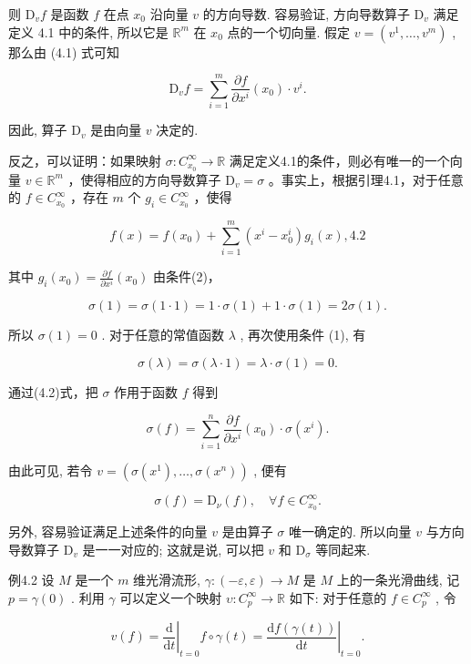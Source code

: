 则  $\mathrm{D}_v f$  是函数  $f$  在点  $x_0$  沿向量  $v$  的方向导数. 容易验证, 方向导数算子  $\mathrm{D}_v$  满足定义 4.1 中的条件, 所以它是  $\mathbb{R}^m$  在  $x_0$  点的一个切向量. 假定  $v = (v^1, \dots, v^m)$ , 那么由 (4.1) 式可知

$$
\mathrm {D} _ {v} f = \sum_ {i = 1} ^ {m} \frac {\partial f}{\partial x ^ {i}} (x _ {0}) \cdot v ^ {i}.
$$

因此, 算子  $\mathrm{D}_v$  是由向量  $v$  决定的.

反之，可以证明：如果映射  $\sigma : C_{x_0}^{\infty} \to \mathbb{R}$  满足定义4.1的条件，则必有唯一的一个向量  $v \in \mathbb{R}^m$ ，使得相应的方向导数算子  $\mathrm{D}_v = \sigma$ 。事实上，根据引理4.1，对于任意的  $f \in C_{x_0}^{\infty}$ ，存在  $m$  个  $g_i \in C_{x_0}^{\infty}$ ，使得

$$
f (x) = f \left(x _ {0}\right) + \sum_ {i = 1} ^ {m} \left(x ^ {i} - x _ {0} ^ {i}\right) g _ {i} (x), %
 {4.2}
$$

其中  $g_{i}(x_{0}) = \frac{\partial f}{\partial x^{i}} (x_{0})$  由条件(2)，

$$
\sigma (1) = \sigma (1 \cdot 1) = 1 \cdot \sigma (1) + 1 \cdot \sigma (1) = 2 \sigma (1).
$$

所以  $\sigma(1) = 0$ . 对于任意的常值函数  $\lambda$ , 再次使用条件 (1), 有

$$
\sigma (\lambda) = \sigma (\lambda \cdot 1) = \lambda \cdot \sigma (1) = 0.
$$

通过(4.2)式，把  $\sigma$  作用于函数  $f$  得到

$$
\sigma (f) = \sum_ {i = 1} ^ {n} \frac {\partial f}{\partial x ^ {i}} (x _ {0}) \cdot \sigma (x ^ {i}).
$$

由此可见, 若令  $v = (\sigma(x^1), \dots, \sigma(x^n))$ , 便有

$$
\sigma (f) = \mathrm {D} _ {\nu} (f), \quad \forall f \in C _ {x _ {0}} ^ {\infty}.
$$

另外, 容易验证满足上述条件的向量  $v$  是由算子  $\sigma$  唯一确定的. 所以向量  $v$  与方向导数算子  $\mathrm{D}_v$  是一一对应的; 这就是说, 可以把  $v$  和  $\mathrm{D}_{\sigma}$  等同起来.

例4.2 设  $M$  是一个  $m$  维光滑流形,  $\gamma : (-\varepsilon, \varepsilon) \to M$  是  $M$  上的一条光滑曲线, 记  $p = \gamma(0)$ . 利用  $\gamma$  可以定义一个映射  $\upsilon : C_p^\infty \to \mathbb{R}$  如下: 对于任意的  $f \in C_p^\infty$ , 令

$$
v (f) = \left. \frac {\mathrm {d}}{\mathrm {d} t} \right| _ {t = 0} f \circ \gamma (t) = \left. \frac {\mathrm {d} f (\gamma (t))}{\mathrm {d} t} \right| _ {t = 0}.
$$

